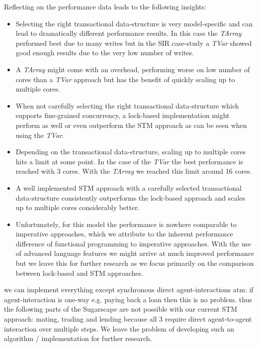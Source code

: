Reflecting on the performance data leads to the following insights:
\begin{itemize}	
	\item Selecting the right transactional data-structure is very model-specific and can lead to dramatically different performance results. In this case the \textit{TArray} performed best due to many writes but in the SIR case-study a \textit{TVar} showed good enough results due to the very low number of writes.
	\item A \textit{TArray} might come with an overhead, performing worse on low number of cores than a \textit{TVar} approach but has the benefit of quickly scaling up to multiple cores.
	\item When not carefully selecting the right transactional data-structure which supports fine-grained concurrency, a lock-based implementation might perform as well or even outperform the STM approach as can be seen when using the \textit{TVar}.
	\item Depending on the transactional data-structure, scaling up to multiple cores hits a limit at some point. In the case of the \textit{TVar} the best performance is reached with 3 cores. With the \textit{TArray} we reached this limit around 16 cores.
	\item A well implemented STM approach with a carefully selected transactional data-structure consistently outperforms the lock-based approach and scales up to multiple cores considerably better.
	\item Unfortunately, for this model the performance is nowhere comparable to imperative approaches, which we attribute to the inherent performance difference of functional programming to imperative approaches. With the use of advanced language features we might arrive at much improved performance but we leave this for further research as we focus primarily on the comparison between lock-based and STM approaches.
\end{itemize}

we can implement everything except synchronous direct agent-interactions atm: if agent-interaction is one-way e.g. paying back a loan then this is no problem. thus the following parts of the Sugarscape are not possible with our current STM approach: mating, trading and lending  because all 3 require direct agent-to-agent interaction over multiple steps. We leave the problem of developing such an algorithm / implementation for further research.